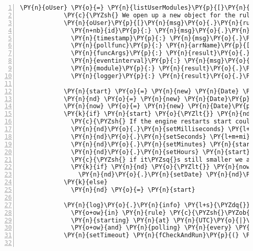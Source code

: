 \begin{Verbatim}[fontsize=\scriptsize,commandchars=\\\{\},numbers=left,firstnumber=1,stepnumber=1]
            \PY{n}{oUser} \PY{o}{=} \PY{n}{listUserModules}\PY{p}{[}\PY{n}{msg}\PY{o}{.}\PY{n}{user}\PY{p}{]}
            \PY{c}{\PYZsh{} We open up a new object for the rule it}
            \PY{n}{oUser}\PY{p}{[}\PY{n}{msg}\PY{o}{.}\PY{n}{rule}\PY{o}{.}\PY{n}{id}\PY{p}{]} \PY{o}{=}
              \PY{n+nb}{id}\PY{p}{:} \PY{n}{msg}\PY{o}{.}\PY{n}{rule}\PY{o}{.}\PY{n}{eventname}
              \PY{n}{timestamp}\PY{p}{:} \PY{n}{msg}\PY{o}{.}\PY{n}{rule}\PY{o}{.}\PY{n}{timestamp}
              \PY{n}{pollfunc}\PY{p}{:} \PY{n}{arrName}\PY{p}{[}\PY{l+m+mi}{1}\PY{p}{]}
              \PY{n}{funcArgs}\PY{p}{:} \PY{n}{result}\PY{o}{.}\PY{n}{funcArgs}
              \PY{n}{eventinterval}\PY{p}{:} \PY{n}{msg}\PY{o}{.}\PY{n}{rule}\PY{o}{.}\PY{n}{eventinterval} \PY{o}{*} \PY{l+m+mi}{60} \PY{o}{*} \PY{l+m+mi}{1000}
              \PY{n}{module}\PY{p}{:} \PY{n}{result}\PY{o}{.}\PY{n}{module}
              \PY{n}{logger}\PY{p}{:} \PY{n}{result}\PY{o}{.}\PY{n}{logger}

            \PY{n}{start} \PY{o}{=} \PY{n}{new} \PY{n}{Date} \PY{n}{msg}\PY{o}{.}\PY{n}{rule}\PY{o}{.}\PY{n}{eventstart}
            \PY{n}{nd} \PY{o}{=} \PY{n}{new} \PY{n}{Date}\PY{p}{(}\PY{p}{)}
            \PY{n}{now} \PY{o}{=} \PY{n}{new} \PY{n}{Date}\PY{p}{(}\PY{p}{)}
            \PY{k}{if} \PY{n}{start} \PY{o}{\PYZlt{}} \PY{n}{nd}
              \PY{c}{\PYZsh{} If the engine restarts start could be from last year even }
              \PY{n}{nd}\PY{o}{.}\PY{n}{setMilliseconds} \PY{l+m+mi}{0}
              \PY{n}{nd}\PY{o}{.}\PY{n}{setSeconds} \PY{l+m+mi}{0}
              \PY{n}{nd}\PY{o}{.}\PY{n}{setMinutes} \PY{n}{start}\PY{o}{.}\PY{n}{getMinutes}\PY{p}{(}\PY{p}{)}
              \PY{n}{nd}\PY{o}{.}\PY{n}{setHours} \PY{n}{start}\PY{o}{.}\PY{n}{getHours}\PY{p}{(}\PY{p}{)}
              \PY{c}{\PYZsh{} if it\PYZsq{}s still smaller we add one day}
              \PY{k}{if} \PY{n}{nd} \PY{o}{\PYZlt{}} \PY{n}{now}
                \PY{n}{nd}\PY{o}{.}\PY{n}{setDate} \PY{n}{nd}\PY{o}{.}\PY{n}{getDate}\PY{p}{(}\PY{p}{)} \PY{o}{+} \PY{l+m+mi}{1}
            \PY{k}{else}
              \PY{n}{nd} \PY{o}{=} \PY{n}{start}
                
            \PY{n}{log}\PY{o}{.}\PY{n}{info} \PY{l+s}{\PYZdq{}}\PY{l+s}{EP | New event module }\PY{l+s}{\PYZsq{}}\PY{l+s}{\PYZsh{}\PYZob{} arrName[0] \PYZcb{}}\PY{l+s}{\PYZsq{}}\PY{l+s}{ loaded for user \PYZsh{}\PYZob{} msg.user \PYZcb{},}
              \PY{o+ow}{in} \PY{n}{rule} \PY{c}{\PYZsh{}\PYZob{} msg.rule.id \PYZcb{}, registered at UTC|\PYZsh{}\PYZob{} msg.rule.timestamp \PYZcb{},}
              \PY{n}{starting} \PY{n}{at} \PY{n}{UTC}\PY{o}{|}\PY{c}{\PYZsh{}\PYZob{} start.toISOString() \PYZcb{} ( which is in \PYZsh{}\PYZob{} ( nd \PYZhy{} now ) / 1000 / 60 \PYZcb{} minutes )}
              \PY{o+ow}{and} \PY{n}{polling} \PY{n}{every} \PY{c}{\PYZsh{}\PYZob{} msg.rule.eventinterval \PYZcb{} minutes\PYZdq{}}
            \PY{n}{setTimeout} \PY{n}{fCheckAndRun}\PY{p}{(} \PY{n}{msg}\PY{o}{.}\PY{n}{user}\PY{p}{,} \PY{n}{msg}\PY{o}{.}\PY{n}{rule}\PY{o}{.}\PY{n}{id}\PY{p}{,} \PY{n}{msg}\PY{o}{.}\PY{n}{rule}\PY{o}{.}\PY{n}{timestamp} \PY{p}{)}\PY{p}{,} \PY{n}{nd} \PY{o}{\PYZhy{}} \PY{n}{now}


\end{Verbatim}
